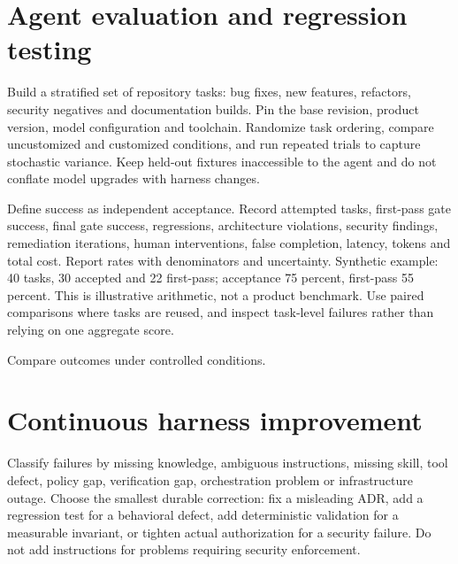 \documentclass[11pt,letterpaper]{article}
\begin{document}
\section{Agent evaluation and regression testing}
Build a stratified set of repository tasks: bug fixes, new features, refactors, security negatives and documentation builds. Pin the base revision, product version, model configuration and toolchain. Randomize task ordering, compare uncustomized and customized conditions, and run repeated trials to capture stochastic variance. Keep held-out fixtures inaccessible to the agent and do not conflate model upgrades with harness changes.

Define success as independent acceptance. Record attempted tasks, first-pass gate success, final gate success, regressions, architecture violations, security findings, remediation iterations, human interventions, false completion, latency, tokens and total cost. Report rates with denominators and uncertainty. Synthetic example: 40 tasks, 30 accepted and 22 first-pass; acceptance 75 percent, first-pass 55 percent. This is illustrative arithmetic, not a product benchmark. Use paired comparisons where tasks are reused, and inspect task-level failures rather than relying on one aggregate score.

\begin{center}\begin{minipage}{\linewidth}\captionsetup{type=figure}\centering{}\caption{Agent evaluation architecture}
\small Compare outcomes under controlled conditions.\end{minipage}\end{center}
\section{Continuous harness improvement}
Classify failures by missing knowledge, ambiguous instructions, missing skill, tool defect, policy gap, verification gap, orchestration problem or infrastructure outage. Choose the smallest durable correction: fix a misleading ADR, add a regression test for a behavioral defect, add deterministic validation for a measurable invariant, or tighten actual authorization for a security failure. Do not add instructions for problems requiring security enforcement.
\end{document}
